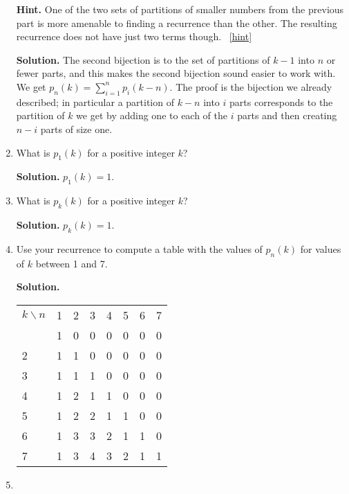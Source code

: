 \documentclass{book}
\begin{document}
\begin{activity}[]
\begin{enumerate}[font=\bfseries,label=(\alph*),ref=\alph*]
\par\smallskip%
\noindent\textbf{Hint.}\hypertarget{hint-137}{}\quad%
\hypertarget{p-1170}{}%
One of the two sets of partitions of smaller numbers from the previous part is more amenable to finding a recurrence than the other. The resulting recurrence does not have just two terms though.%
~\hfill{\tiny\hyperlink{a-215.d}{[hint]}\hypertarget{q-215.d}{}}\par\smallskip%
\noindent\textbf{Solution.}\hypertarget{solution-108}{}\quad%
\hypertarget{p-1171}{}%
The second bijection is to the set of partitions of \(k-1\) into \(n\) or fewer parts, and this makes the second bijection sound easier to work with. We get \(p_n(k)=\sum_{i=1}^n p_i(k-n)\). The proof is the bijection we already described; in particular a partition of \(k-n\) into \(i\) parts corresponds to the partition of \(k\) we get by adding one to each of the \(i\) parts and then creating \(n-i\) parts of size one.%
\item\label{task-223} \hypertarget{p-1172}{}%
What is \(p_1(k)\) for a positive integer \(k\)?%
\par\smallskip%
\noindent\textbf{Solution.}\hypertarget{solution-109}{}\quad%
\hypertarget{p-1173}{}%
\(p_1(k)=1\).%
\item\label{task-224} \hypertarget{p-1174}{}%
What is \(p_k(k)\) for a positive integer \(k\)?%
\par\smallskip%
\noindent\textbf{Solution.}\hypertarget{solution-110}{}\quad%
\hypertarget{p-1175}{}%
\(p_k(k)=1\).%
\item\label{task-225} \hypertarget{p-1176}{}%
Use your recurrence to compute a table with the values of \(p_n(k)\) for values of \(k\) between 1 and 7.%
\par\smallskip%
\noindent\textbf{Solution.}\hypertarget{solution-111}{}\quad%
\begin{sidebyside}{1}{0}{0}{0}
\begin{sbspanel}{1}
{\centering%
\begin{tabular}{llllllll}
\(k\backslash n\)&1&2&3&4&5&6&7\tabularnewline\hrulethin
1&1&0&0&0&0&0&0\tabularnewline[0pt]
2&1&1&0&0&0&0&0\tabularnewline[0pt]
3&1&1&1&0&0&0&0\tabularnewline[0pt]
4&1&2&1&1&0&0&0\tabularnewline[0pt]
5&1&2&2&1&1&0&0\tabularnewline[0pt]
6&1&3&3&2&1&1&0\tabularnewline[0pt]
7&1&3&4&3&2&1&1
\end{tabular}
\par}
\end{sbspanel}
\end{sidebyside}
\item\label{task-226} \hypertarget{p-1177}{}%

\end{enumerate}
\end{activity}
\end{document}
